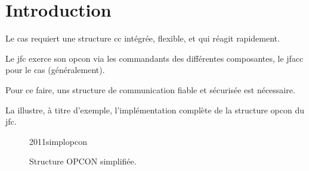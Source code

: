 \section{Introduction}

\begin{e1}
	\item Le \gls{cas} requiert une structure \gls{cc} intégrée, flexible, et qui réagit rapidement.
	
	\item Le \gls{jfc} exerce son \gls{opcon} via les commandants des différentes composantes, le \gls{jfacc} pour le \gls{cas} (généralement).
	
	Pour ce faire, uns structure de communication fiable et sécurisée est nécessaire.
	
	La  illustre, à titre d'exemple, l'implémentation complète de la structure \gls{opcon} du \gls{jfc}.
	
\end{e1}


\begin{figure}[H]
	{2011simplopcon}
	
	\caption{Structure OPCON simplifiée.}
	\label{fig:simplopcon} 
\end{figure}